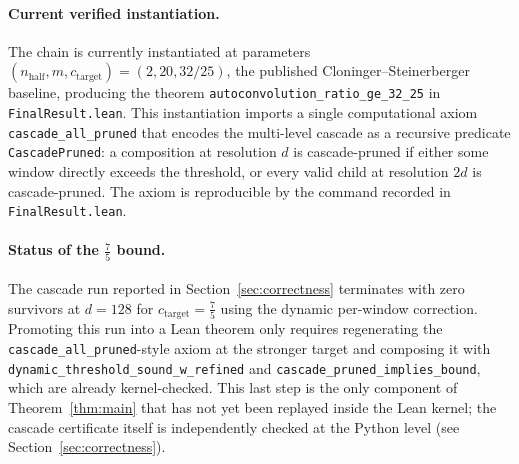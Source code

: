 \documentclass[11pt, letterpaper]{article}
\theoremstyle{paperplain}
\theoremstyle{paperdef}
\begin{document}
\paragraph{Current verified instantiation.}
The chain is currently instantiated at parameters
$(n_{\mathrm{half}}, m, c_{\mathrm{target}}) = (2, 20, 32/25)$, the
published Cloninger--Steinerberger baseline, producing the theorem
\texttt{autoconvolution\_ratio\_ge\_32\_25} in
\texttt{FinalResult.lean}.  This instantiation imports a single
computational axiom \texttt{cascade\_all\_pruned} that encodes the
multi-level cascade as a recursive predicate \texttt{CascadePruned}:
a composition at resolution $d$ is cascade-pruned if either some
window directly exceeds the threshold, or every valid child at
resolution $2d$ is cascade-pruned.  The axiom is reproducible by the
command recorded in \texttt{FinalResult.lean}.

\paragraph{Status of the $\tfrac{7}{5}$ bound.}
The cascade run reported in Section~\ref{sec:correctness} terminates
with zero survivors at $d=128$ for $c_{\mathrm{target}}=\tfrac{7}{5}$
using the dynamic per-window correction.  Promoting this run into a
Lean theorem only requires regenerating the
\texttt{cascade\_all\_pruned}-style axiom at the stronger target and
composing it with \texttt{dynamic\_threshold\_sound\_w\_refined}
and \texttt{cascade\_pruned\_implies\_bound}, which are already
kernel-checked.  This last step is the only component of
Theorem~\ref{thm:main} that has not yet been replayed inside the Lean
kernel; the cascade certificate itself is independently checked at
the Python level (see Section~\ref{sec:correctness}).
\end{document}
